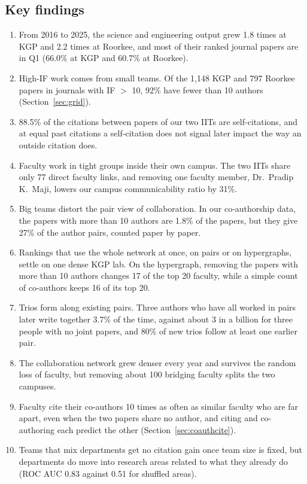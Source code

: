 \documentclass[conference,10pt]{IEEEtran}
\begin{document}
\subsection{Key findings}
\begin{enumerate}
\item From 2016 to 2025, the science and engineering output grew 1.8 times at KGP and 2.2 times at Roorkee, and most of
their ranked journal papers are in Q1 (66.0\% at KGP and 60.7\% at Roorkee).
\item High-IF work comes from small teams. Of the 1,148 KGP and 797 Roorkee papers in journals with IF $>$ 10, 92\%
have fewer than 10 authors (Section~\ref{sec:grid}).
\item 88.5\% of the citations between papers of our two IITs are self-citations, and at equal past citations a
self-citation does not signal later impact the way an outside citation does.
\item Faculty work in tight groups inside their own campus. The two IITs share only 77 direct faculty links, and removing
one faculty member, Dr.~Pradip K.\ Maji, lowers our campus communicability ratio by 31\%.
\item Big teams distort the pair view of collaboration. In our co-authorship data, the papers with more than 10 authors
are 1.8\% of the papers, but they give 27\% of the author pairs, counted paper by paper.
\item Rankings that use the whole network at once, on pairs or on hypergraphs, settle on one dense KGP lab. On the
hypergraph, removing the papers with more than 10 authors changes 17 of the top 20 faculty, while a simple count of
co-authors keeps 16 of its top 20.
\item Trios form along existing pairs. Three authors who have all worked in pairs later write together 3.7\% of the
time, against about 3 in a billion for three people with no joint papers, and 80\% of new trios follow at least one
earlier pair.
\item The collaboration network grew denser every year and survives the random loss of faculty, but removing about 100
bridging faculty splits the two campuses.
\item Faculty cite their co-authors 10 times as often as similar faculty who are far apart, even when the two papers
share no author, and citing and co-authoring each predict the other (Section~\ref{sec:coauthcite}).
\item Teams that mix departments get no citation gain once team size is fixed, but departments do move into research
areas related to what they already do (ROC AUC 0.83 against 0.51 for shuffled areas).
\end{enumerate}
\end{document}
